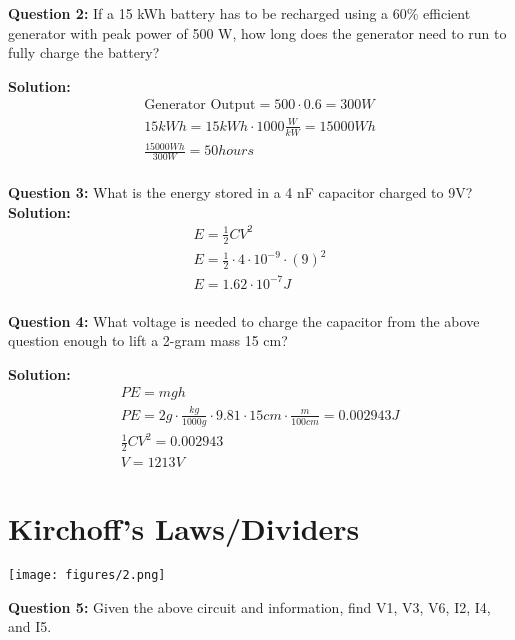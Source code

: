\documentclass{article}
\begin{document}
\textbf{Question 2:} If a 15 kWh battery has to be recharged using a 60\% efficient generator with peak power of 500 W, how long does the generator need to run to fully charge the battery?

\textbf{Solution:}
\begin{align*}
    \text{Generator Output} = 500 \cdot 0.6 = 300 W  \\
    15 kWh = 15 kWh \cdot 1000   \frac{W}{kW}  = 15000 Wh\\
    \frac{15000 Wh}{300 W} = \boxed{50 hours} \\
\end{align*}








\textbf{Question 3:} What is the energy stored in a 4 nF capacitor charged to 9V?
\textbf{Solution:}
\begin{align*}
    E = \frac{1}{2}CV^{2}\\
    E = \frac{1}{2}\cdot 4\cdot 10^{-9}\cdot(9)^{2}\\
    E =  \boxed{1.62 \cdot 10^{-7} J}\\
\end{align*}


\textbf{Question 4:} What voltage is needed to charge the capacitor from the above question enough to lift a 2-gram mass 15 cm?

\textbf{Solution:}
\begin{align*}
    PE = mgh\\
    PE = 2g\cdot \frac{kg}{1000 g} \cdot9.81 \cdot 15cm \cdot \frac{m}{100 cm} = 0.002943 J\\ 
    \frac{1}{2}CV^{2} =  0.002943\\
    V = \boxed{1213 V}
\end{align*}


\section*{Kirchoff's Laws/Dividers}

\begin{center}
    \texttt{[image: figures/2.png]}
\end{center}

\textbf{Question 5:} Given the above circuit and information, find V1, V3, V6, I2, I4, and I5.
\end{document}
